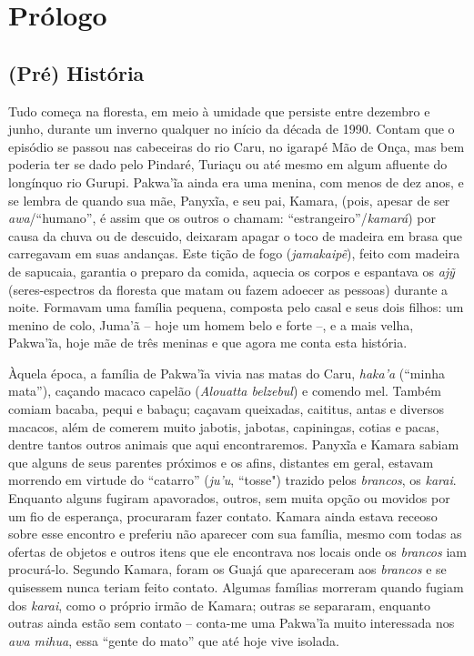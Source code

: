 \chapter{Prólogo}\label{pruxf3logo}

\section{(Pré) História}\label{pruxe9-histuxf3ria}

Tudo começa na floresta, em meio à umidade que persiste entre dezembro e
junho, durante um inverno qualquer no início da década de 1990. Contam
que o episódio se passou nas cabeceiras do rio Caru, no igarapé
Mão de Onça, mas bem poderia ter se dado pelo Pindaré, Turiaçu ou até
mesmo em algum afluente do longínquo rio Gurupi. Pakwa'ĩa ainda era uma
menina, com menos de dez anos, e se lembra de quando sua mãe, Panyxĩa, e
seu pai, Kamara, (pois, apesar de ser \emph{awa}/``humano'', é assim que
os outros o chamam: ``estrangeiro''/\emph{kamará}) por causa da chuva ou
de descuido, deixaram apagar o toco de madeira em brasa que carregavam
em suas andanças. Este tição de fogo (\emph{jamakaipẽ}), feito com
madeira de sapucaia, garantia o preparo da comida, aquecia os corpos e
espantava os \emph{ajỹ} (seres-espectros da floresta que matam ou fazem
adoecer as pessoas) durante a noite. Formavam uma família pequena,
composta pelo casal e seus dois filhos: um menino de colo, Juma'ã -- hoje
um homem belo e forte --, e a mais velha, Pakwa'ĩa, hoje mãe de três
meninas e que agora me conta esta história.

Àquela época, a família de Pakwa'ĩa vivia nas matas do Caru,
\emph{haka'a} (``minha mata''), caçando macaco capelão (\emph{Alouatta
belzebul}) e comendo mel. Também comiam bacaba, pequi e babaçu; caçavam
queixadas, caititus, antas e diversos macacos, além de comerem muito
jabotis, jabotas, capiningas, cotias e pacas, dentre tantos outros
animais que aqui encontraremos. Panyxĩa e Kamara sabiam que alguns de
seus parentes próximos e os afins, distantes em geral, estavam morrendo
em virtude do ``catarro'' (\emph{ju'u}, ``tosse") trazido pelos
\emph{brancos}, os \emph{karai}. Enquanto alguns fugiram apavorados,
outros, sem muita opção ou movidos por um fio de esperança, procuraram
fazer contato. Kamara ainda estava receoso sobre esse encontro e
preferiu não aparecer com sua família, mesmo com todas as ofertas de
objetos e outros itens que ele encontrava nos locais onde os
\emph{brancos} iam procurá-lo. Segundo Kamara, foram os Guajá que
apareceram aos \emph{brancos} e se quisessem nunca teriam feito contato. Algumas famílias morreram quando fugiam dos \emph{karai}, como
o próprio irmão de Kamara; outras se separaram, enquanto outras ainda
estão sem contato -- conta-me uma Pakwa'ĩa muito interessada nos
\emph{awa mihua}, essa ``gente do mato'' que até hoje vive isolada.

